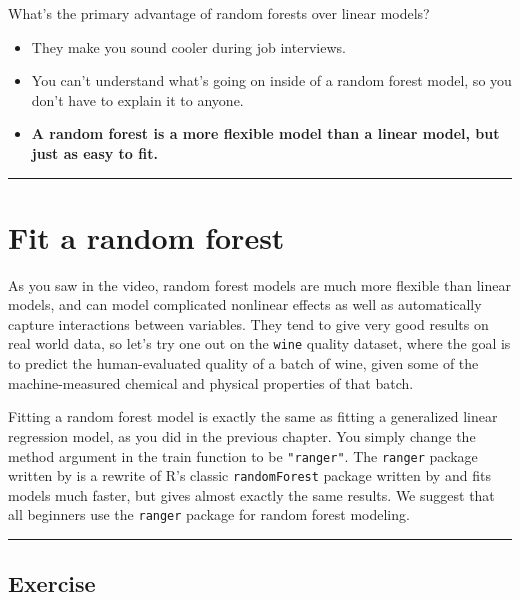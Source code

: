 \documentclass[]{book}
\begin{document}
What's the primary advantage of random forests over linear models?

\begin{itemize}
\item
  They make you sound cooler during job interviews.
\item
  You can't understand what's going on inside of a random forest model,
  so you don't have to explain it to anyone.
\item
  \textbf{A random forest is a more flexible model than a linear model,
  but just as easy to fit.}
\end{itemize}

\begin{center}\rule{0.5\linewidth}{\linethickness}\end{center}

\section{Fit a random forest}\label{fit-a-random-forest}

As you saw in the video, random forest models are much more flexible
than linear models, and can model complicated nonlinear effects as well
as automatically capture interactions between variables. They tend to
give very good results on real world data, so let's try one out on the
\texttt{wine} quality dataset, where the goal is to predict the
human-evaluated quality of a batch of wine, given some of the
machine-measured chemical and physical properties of that batch.

Fitting a random forest model is exactly the same as fitting a
generalized linear regression model, as you did in the previous chapter.
You simply change the method argument in the train function to be
\texttt{"ranger"}. The \texttt{ranger} package written by
\citet{R-ranger} is a rewrite of R's classic \texttt{randomForest}
package written by \citet{R-randomForest} and fits models much faster,
but gives almost exactly the same results. We suggest that all beginners
use the \texttt{ranger} package for random forest modeling.

\begin{center}\rule{0.5\linewidth}{\linethickness}\end{center}

\subsection*{Exercise}\label{exercise-17}
\end{document}
